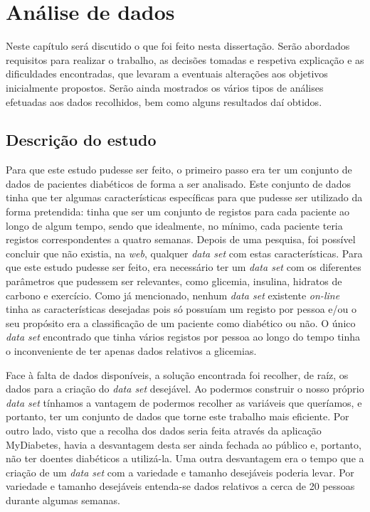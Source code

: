 \chapter{Análise de dados}\label{chap:dese}

Neste capítulo será discutido o que foi feito nesta dissertação. Serão abordados requisitos para realizar o trabalho, as decisões tomadas e respetiva explicação e as dificuldades encontradas, que levaram a eventuais alterações aos objetivos inicialmente propostos. Serão ainda mostrados os vários tipos de análises efetuadas aos dados recolhidos, bem como alguns resultados daí obtidos. 

\section{Descrição do estudo}

Para que este estudo pudesse ser feito, o primeiro passo era ter um conjunto de dados de pacientes diabéticos de forma a ser analisado. Este conjunto de dados tinha que ter algumas características específicas para que pudesse ser utilizado da forma pretendida: tinha que ser um conjunto de registos para cada paciente ao longo de algum tempo, sendo que idealmente, no mínimo, cada paciente teria registos correspondentes a quatro semanas. Depois de uma pesquisa, foi possível concluir que não existia, na \textit{web}, qualquer \textit{data set} com estas características.
Para que este estudo pudesse ser feito, era necessário ter um \textit{data set} com os diferentes parâmetros que pudessem ser relevantes, como glicemia, insulina, hidratos de carbono e exercício. 
Como já mencionado, nenhum \textit{data set} existente \textit{on-line} tinha as características desejadas pois só possuíam um registo por pessoa e/ou o seu propósito era a classificação de um paciente como diabético ou não. O único \textit{data set} encontrado que tinha vários registos por pessoa ao longo do tempo tinha o inconveniente de ter apenas dados relativos a glicemias.

Face à falta de dados disponíveis, a solução encontrada foi recolher, de raíz, os dados para a criação do \textit{data set} desejável. Ao podermos construir o nosso próprio \textit{data set} tínhamos a vantagem de podermos recolher as variáveis que queríamos, e portanto, ter um conjunto de dados que torne este trabalho mais eficiente. Por outro lado, visto que a recolha dos dados seria feita através da aplicação MyDiabetes, havia a desvantagem desta ser ainda fechada ao público e, portanto, não ter doentes diabéticos a utilizá-la. Uma outra desvantagem era o tempo que a criação de um \textit{data set} com a variedade e tamanho desejáveis poderia levar. Por variedade e tamanho desejáveis entenda-se dados relativos a cerca de 20 pessoas durante algumas semanas.

